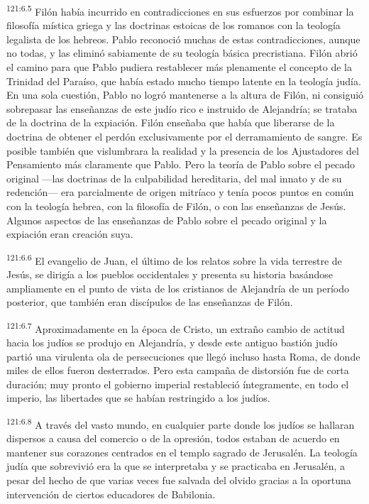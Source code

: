 \par 
\textsuperscript{121:6.5} Filón había incurrido en contradicciones en sus esfuerzos por combinar la filosofía mística griega y las doctrinas estoicas de los romanos con la teología legalista de los hebreos. Pablo reconoció muchas de estas contradicciones, aunque no todas, y las eliminó sabiamente de su teología básica precristiana. Filón abrió el camino para que Pablo pudiera restablecer más plenamente el concepto de la Trinidad del Paraíso, que había estado mucho tiempo latente en la teología judía. En una sola cuestión, Pablo no logró mantenerse a la altura de Filón, ni consiguió sobrepasar las enseñanzas de este judío rico e instruido de Alejandría; se trataba de la doctrina de la expiación. Filón enseñaba que había que liberarse de la doctrina de obtener el perdón exclusivamente por el derramamiento de sangre. Es posible también que vislumbrara la realidad y la presencia de los Ajustadores del Pensamiento más claramente que Pablo. Pero la teoría de Pablo sobre el pecado original ---las doctrinas de la culpabilidad hereditaria, del mal innato y de su redención--- era parcialmente de origen mitríaco y tenía pocos puntos en común con la teología hebrea, con la filosofía de Filón, o con las enseñanzas de Jesús. Algunos aspectos de las enseñanzas de Pablo sobre el pecado original y la expiación eran creación suya.

\par 
\textsuperscript{121:6.6} El evangelio de Juan, el último de los relatos sobre la vida terrestre de Jesús, se dirigía a los pueblos occidentales y presenta su historia basándose ampliamente en el punto de vista de los cristianos de Alejandría de un período posterior, que también eran discípulos de las enseñanzas de Filón.

\par 
\textsuperscript{121:6.7} Aproximadamente en la época de Cristo, un extraño cambio de actitud hacia los judíos se produjo en Alejandría, y desde este antiguo bastión judío partió una virulenta ola de persecuciones que llegó incluso hasta Roma, de donde miles de ellos fueron desterrados. Pero esta campaña de distorsión fue de corta duración; muy pronto el gobierno imperial restableció íntegramente, en todo el imperio, las libertades que se habían restringido a los judíos.

\par 
\textsuperscript{121:6.8} A través del vasto mundo, en cualquier parte donde los judíos se hallaran dispersos a causa del comercio o de la opresión, todos estaban de acuerdo en mantener sus corazones centrados en el templo sagrado de Jerusalén. La teología judía que sobrevivió era la que se interpretaba y se practicaba en Jerusalén, a pesar del hecho de que varias veces fue salvada del olvido gracias a la oportuna intervención de ciertos educadores de Babilonia.

